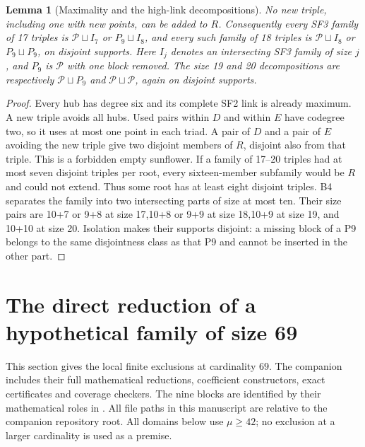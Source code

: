\documentclass[11pt,a4paper]{article}
\numberwithin{equation}{section}
\newtheorem{lemma}[theorem]{Lemma}
\theoremstyle{remark}
\newcommand{\Pten}{\mathcal P}
\begin{document}
\begin{lemma}[Maximality and the high-link decompositions]\label{lem:r16maximal}
No new triple, including one with new points, can be added to $ R $.
Consequently every SF3 family of 17 triples is $\Pten\sqcup I_7$ or
$ P_9\sqcup I_8$, and every such family of 18 triples is
$\Pten\sqcup I_8$ or $ P_9\sqcup P_9$, on disjoint supports.
Here $ I_j $ denotes an intersecting SF3 family of size $ j $, and
$ P_9$ is $\Pten $ with one block removed.
The size 19 and 20 decompositions are respectively
$\Pten\sqcup P_9$ and $\Pten\sqcup\Pten $, again on disjoint supports.
\end{lemma}
\begin{proof}
Every hub has degree six and its complete SF2 link is already maximum.
A new triple avoids all hubs. Used pairs within $ D $ and within $ E $ have
codegree two, so it uses at most one point in each triad. A pair of $ D $
and a pair of $ E $ avoiding the new triple give two disjoint members of
$ R $, disjoint also from that triple. This is a forbidden empty sunflower.
If a family of 17--20 triples had at most seven disjoint triples per
root, every sixteen-member subfamily would be $ R $ and could not extend.
Thus some root has at least eight disjoint triples. B4 separates the
family into two intersecting parts of size at most ten. Their size pairs
are 10+7 or 9+8 at size 17,10+8 or 9+9 at size 18,10+9 at size 19,
and 10+10 at size 20. Isolation makes their
supports disjoint: a missing block of a P9 belongs to the same
disjointness class as that P9 and cannot be inserted in the other part.
\end{proof}

\section{The direct reduction of a hypothetical family of size 69}
\label{sec:f69branches}

This section gives the local finite exclusions at cardinality $69$.
The companion includes their full mathematical reductions, coefficient
constructors, exact certificates and coverage checkers. The nine blocks
are identified by their mathematical roles in .
All file paths in this manuscript are relative to the companion repository root.
All domains below use $\mu\ge42$; no exclusion at a larger cardinality is
used as a premise.
\end{document}
